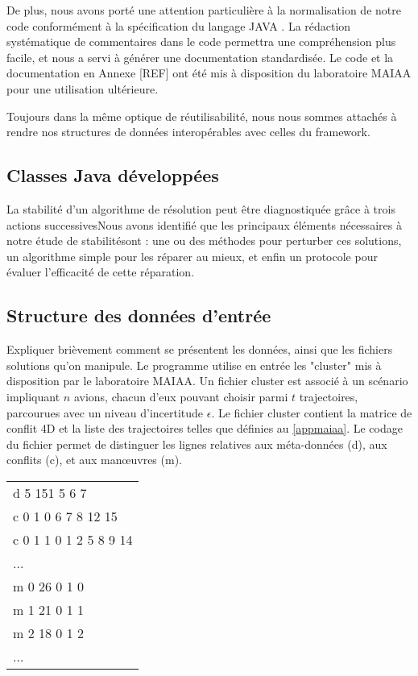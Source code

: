 De plus, nous avons porté une attention particulière à la normalisation de notre code conformément à la spécification du langage JAVA \cite{javaspec}. La rédaction systématique de commentaires dans le code permettra une compréhension plus facile, et nous a servi à générer une documentation standardisée. Le code et la documentation en Annexe [REF] ont été mis à disposition du laboratoire MAIAA pour une utilisation ultérieure.

Toujours dans la même optique de réutilisabilité, nous nous sommes attachés à rendre nos structures de données interopérables avec celles du framework.

\subsection{Classes Java développées}
La stabilité d'un algorithme de résolution peut être diagnostiquée grâce à trois actions successivesNous avons identifié que les principaux éléments nécessaires à notre étude de stabilitésont : une ou des méthodes pour perturber ces solutions, un algorithme simple pour les réparer au mieux, et enfin un protocole pour évaluer l'efficacité de cette réparation. 

\subsection{Structure des données d'entrée}
Expliquer brièvement comment se présentent les données, ainsi que les fichiers solutions qu'on manipule.
Le programme utilise en entrée les "cluster" mis à disposition par le laboratoire MAIAA. Un fichier cluster est associé à un scénario impliquant $n$ avions, chacun d'eux pouvant choisir parmi $t$ trajectoires, parcourues avec un niveau d'incertitude $\epsilon$. Le fichier cluster contient la matrice de conflit 4D et la liste des trajectoires telles que définies au \ref{appmaiaa}. Le codage du fichier permet de distinguer les lignes relatives aux méta-données (d), aux conflits (c), et aux manœuvres (m).\\


\begin{tabular}{|l|}
\hline
d 5 151 5 6 7 \\
c 0 1 0 6 7 8 12 15 \\
c 0 1 1 0 1 2 5 8 9 14 \\
... \\
m 0 26 0 1 0 \\
m 1 21 0 1 1 \\
m 2 18 0 1 2 \\
... \\
\hline
\end{tabular}\\


